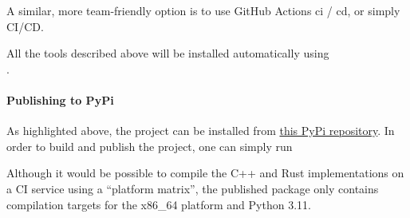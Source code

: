 A similar, more team-friendly option is to use GitHub Actions \gls{ci} / \gls{cd}, or simply CI/CD.

All the tools described above will be installed automatically using \\
.

\paragraph{Publishing to PyPi}
As highlighted above, the project can be installed from \href{https://pypi.org/project/melon-scheduler/}{this PyPi repository}.
In order to build and publish the project, one can simply run


Although it would be possible to compile the C++ and Rust implementations on a CI service using a ``platform matrix'', the published package only contains compilation targets for the x86\_64 platform and Python 3.11.
